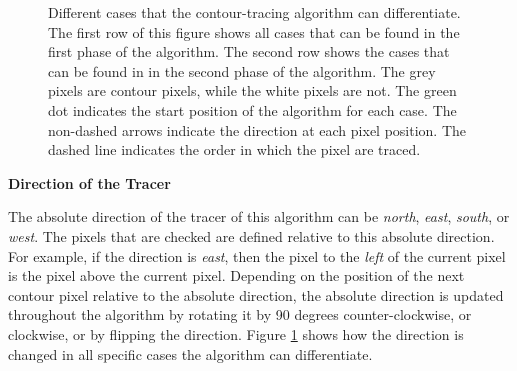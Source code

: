 \documentclass[thesis.tex]{subfiles}
\begin{document}
\begin{figure}[t]
%
%
\caption{Different cases that the contour-tracing algorithm \cite{seo2016fast} can differentiate. The first row of this figure shows all cases that can be found in the first phase of the algorithm. The second row shows the cases that can be found in in the second phase of the algorithm. The grey pixels are contour pixels, while the white pixels are not. The green dot indicates the start position of the algorithm for each case. The non-dashed arrows indicate the direction at each pixel position. The dashed line indicates the order in which the pixel are traced.}
 \label{fig:contour_tracing}
\end{figure}

\textbf{Direction of the Tracer}

The absolute direction of the tracer of this algorithm can be \textit{north}, \textit{east}, \textit{south}, or \textit{west}. The pixels that are checked are defined relative to this absolute direction. For example, if the direction is \textit{east}, then the pixel to the \textit{left} of the current pixel is the pixel above the current pixel. Depending on the position of the next contour pixel relative to the absolute direction, the absolute direction is updated throughout the algorithm by rotating it by 90 degrees counter-clockwise, or clockwise, or by flipping the direction. Figure \ref{fig:contour_tracing} shows how the direction is changed in all specific cases the algorithm can differentiate.
\end{document}
